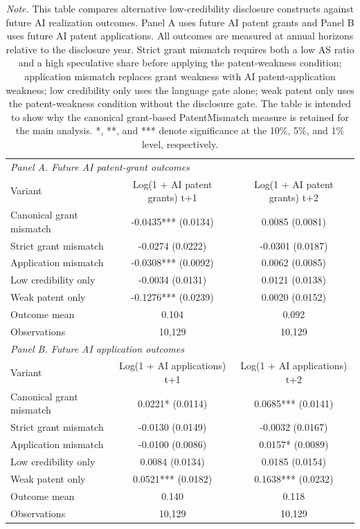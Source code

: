 \begin{table}[!htbp]
\centering
\caption{Construct-variant screen for future AI realization}
\label{tab:construct_variant_screen}
\begin{tabular}{lcc}
\hline
\multicolumn{3}{l}{\textit{Panel A. Future AI patent-grant outcomes}} \\
Variant & Log(1 + AI patent grants) t+1 & Log(1 + AI patent grants) t+2 \\
\hline
Canonical grant mismatch & -0.0435*** (0.0134) & 0.0085 (0.0081) \\
Strict grant mismatch & -0.0274 (0.0222) & -0.0301 (0.0187) \\
Application mismatch & -0.0308*** (0.0092) & 0.0062 (0.0085) \\
Low credibility only & -0.0034 (0.0131) & 0.0121 (0.0138) \\
Weak patent only & -0.1276*** (0.0239) & 0.0020 (0.0152) \\
Outcome mean & 0.104 & 0.092 \\
Observations & 10,129& 10,129\\
\hline
\multicolumn{3}{l}{\textit{Panel B. Future AI application outcomes}} \\
Variant & Log(1 + AI applications) t+1 & Log(1 + AI applications) t+2 \\
\hline
Canonical grant mismatch & 0.0221* (0.0114) & 0.0685*** (0.0141) \\
Strict grant mismatch & -0.0130 (0.0149) & -0.0032 (0.0167) \\
Application mismatch & -0.0100 (0.0086) & 0.0157* (0.0089) \\
Low credibility only & 0.0084 (0.0134) & 0.0185 (0.0154) \\
Weak patent only & 0.0521*** (0.0182) & 0.1638*** (0.0232) \\
Outcome mean & 0.140 & 0.118 \\
Observations & 10,129& 10,129\\
\hline
\end{tabular}

\begin{flushleft}
\caption*{\footnotesize \textit{Note.} This table compares alternative low-credibility disclosure constructs against future AI realization outcomes. Panel A uses future AI patent grants and Panel B uses future AI patent applications. All outcomes are measured at annual horizons relative to the disclosure year. Strict grant mismatch requires both a low AS ratio and a high speculative share before applying the patent-weakness condition; application mismatch replaces grant weakness with AI patent-application weakness; low credibility only uses the language gate alone; weak patent only uses the patent-weakness condition without the disclosure gate. The table is intended to show why the canonical grant-based PatentMismatch measure is retained for the main analysis. *, **, and *** denote significance at the 10\%, 5\%, and 1\% level, respectively.}
\end{flushleft}

\end{table}
